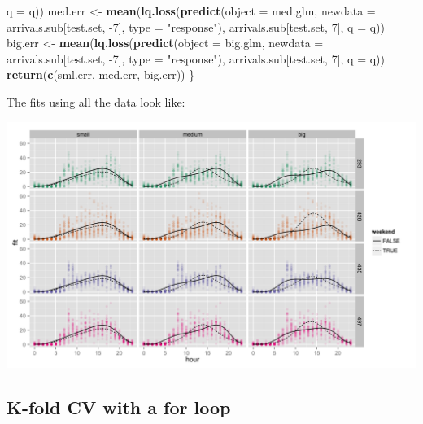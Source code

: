 \documentclass[]{article}
\newenvironment{Shaded}{\begin{snugshade}}{\end{snugshade}}
\newcommand{\KeywordTok}[1]{\textcolor[rgb]{0.13,0.29,0.53}{\textbf{{#1}}}}
\newcommand{\DataTypeTok}[1]{\textcolor[rgb]{0.13,0.29,0.53}{{#1}}}
\newcommand{\DecValTok}[1]{\textcolor[rgb]{0.00,0.00,0.81}{{#1}}}
\newcommand{\StringTok}[1]{\textcolor[rgb]{0.31,0.60,0.02}{{#1}}}
\newcommand{\NormalTok}[1]{{#1}}
\begin{document}
\begin{Shaded}
\begin{Highlighting}[]
                            \DataTypeTok{q =} \NormalTok{q))}
    \NormalTok{med.err <-}\StringTok{ }\KeywordTok{mean}\NormalTok{(}\KeywordTok{lq.loss}\NormalTok{(}\KeywordTok{predict}\NormalTok{(}\DataTypeTok{object =} \NormalTok{med.glm,}
                                    \DataTypeTok{newdata =} \NormalTok{arrivals.sub[test.set, -}\DecValTok{7}\NormalTok{],}
                                    \DataTypeTok{type =} \StringTok{"response"}\NormalTok{),}
                            \NormalTok{arrivals.sub[test.set, }\DecValTok{7}\NormalTok{],}
                            \DataTypeTok{q =} \NormalTok{q))}
    \NormalTok{big.err <-}\StringTok{ }\KeywordTok{mean}\NormalTok{(}\KeywordTok{lq.loss}\NormalTok{(}\KeywordTok{predict}\NormalTok{(}\DataTypeTok{object =} \NormalTok{big.glm,}
                                    \DataTypeTok{newdata =} \NormalTok{arrivals.sub[test.set, -}\DecValTok{7}\NormalTok{],}
                                    \DataTypeTok{type =} \StringTok{"response"}\NormalTok{),}
                            \NormalTok{arrivals.sub[test.set, }\DecValTok{7}\NormalTok{],}
                            \DataTypeTok{q =} \NormalTok{q))}
    \KeywordTok{return}\NormalTok{(}\KeywordTok{c}\NormalTok{(sml.err, med.err, big.err))}
\NormalTok{\}}
\end{Highlighting}
\end{Shaded}

The fits using all the data look like:

\includegraphics{./fig/fit_all.png}

\subsection{K-fold CV with a for loop}\label{k-fold-cv-with-a-for-loop}
\end{document}
